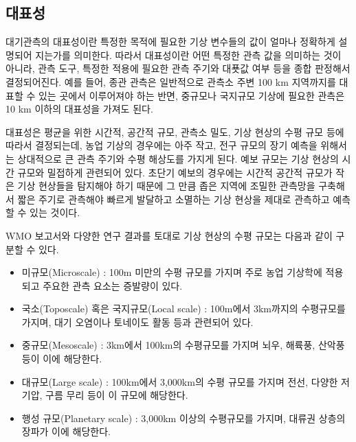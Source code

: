 \subsection{대표성}

대기관측의 대표성이란 특정한 목적에 필요한 기상 변수들의 값이 얼마나 정확하게 설명되어 지는가를 의미한다. 따라서 대표성이란 어떤 특정한 관측 값을 의미하는 것이 아니라, 관측 도구, 특정한 적용에 필요한 관측 주기와 대푯값 여부 등을 종합 판정해서 결정되어진다. 예를 들어, 종관 관측은 일반적으로 관측소 주변 100 km 지역까지를 대표할 수 있는 곳에서 이루어져야 하는 반면, 중규모나 국지규모 기상에 필요한 관측은 10 km 이하의 대표성을 가져도 된다.

대표성은 평균을 위한 시간적, 공간적 규모, 관측소 밀도, 기상 현상의 수평 규모 등에 따라서 결정되는데, 농업 기상의 경우에는 아주 작고, 전구 규모의 장기 예측을 위해서는 상대적으로 큰 관측 주기와 수평 해상도를 가지게 된다. 예보 규모는 기상 현상의 시간 규모와 밀접하게 관련되어 있다. 초단기 예보의 경우에는 시간적 공간적 규모가 작은 기상 현상들을 탐지해야 하기 때문에 그 만큼 좁은 지역에 조밀한 관측망을 구축해서 짧은 주기로 관측해야 빠르게 발달하고 소멸하는 기상 현상을 제대로 관측하고 예측할 수 있는 것이다. 

WMO 보고서와 다양한 연구 결과를 토대로 기상 현상의 수평 규모는 다음과 같이 구분할 수 있다.
\begin{itemize}
	\item 미규모(Microscale) : 100m 미만의 수평 규모를 가지며 주로 농업 기상학에 적용되고 주요한 관측 요소는 증발량이 있다.
	\item 국소(Toposcale) 혹은 국지규모(Local scale) : 100m에서 3km까지의 수평규모를 가지며, 대기 오염이나 토네이도 활동 등과 관련되어 있다.
	\item 중규모(Mesoscale) : 3km에서 100km의 수평규모를 가지며 뇌우, 해륙풍, 산악풍 등이 이에 해당한다.
	\item 대규모(Large scale) : 100km에서 3,000km의 수평 규모를 가지며 전선, 다양한 저기압, 구름 무리 등이 이 규모에 해당한다.
	\item 행성 규모(Planetary scale) : 3,000km 이상의 수평규모를 가지며, 대류권 상층의 장파가 이에 해당한다.
\end{itemize}


